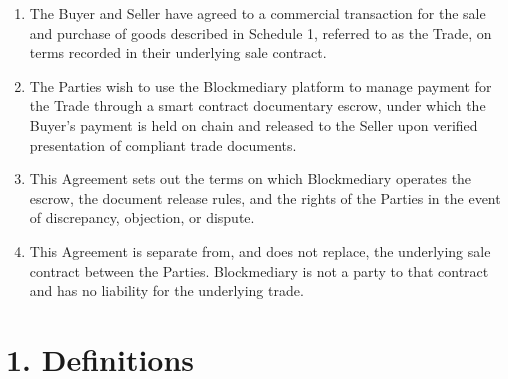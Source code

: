 \documentclass[12pt, a4paper]{article}
\begin{document}
\begin{enumerate}[label=\Alph*.]
\item The Buyer and Seller have agreed to a commercial transaction for the sale and
purchase of goods described in Schedule 1, referred to as the Trade, on terms recorded in
their underlying sale contract.
\item The Parties wish to use the Blockmediary platform to manage payment for the Trade
through a smart contract documentary escrow, under which the Buyer's payment is held on
chain and released to the Seller upon verified presentation of compliant trade documents.
\item This Agreement sets out the terms on which Blockmediary operates the escrow, the
document release rules, and the rights of the Parties in the event of discrepancy,
objection, or dispute.
\item This Agreement is separate from, and does not replace, the underlying sale contract
between the Parties. Blockmediary is not a party to that contract and has no liability for
the underlying trade.
\end{enumerate}

\section*{1. Definitions}
\end{document}
